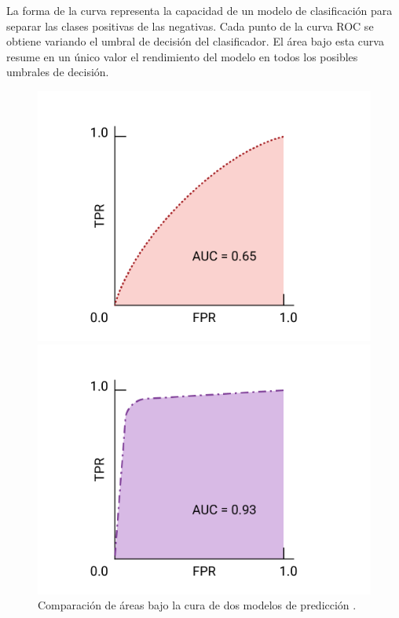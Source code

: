 La forma de la curva representa la capacidad de un modelo de clasificación para separar las clases positivas de las negativas. Cada punto de la curva ROC se obtiene variando el umbral de decisión del clasificador. El área bajo esta curva resume en un único valor el rendimiento del modelo en todos los posibles umbrales de decisión.

\begin{figure}[h]
	\centering
	\begin{minipage}{0.49\linewidth}
		\centering
		\includegraphics[width=\linewidth]{figures/ejemplos/auc_0-65_google_ejemplo.png}
	\end{minipage}\hfill
	\begin{minipage}{0.49\linewidth}
		\centering
		\includegraphics[width=\linewidth]{figures/ejemplos/auc_0-93_google_ejemplo.png}
	\end{minipage}
	\caption{Comparación de áreas bajo la cura de dos modelos de predicción \cite{googledev-rocauc}.}
	\label{fig:auc_65_google}
\end{figure}

